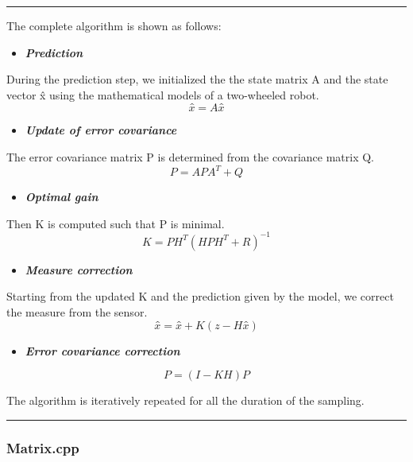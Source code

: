 \begin{center}\rule{0.5\linewidth}{0.5pt}\end{center}

The complete algorithm is shown as follows:

\begin{itemize}
\tightlist
\item
  \textbf{\emph{Prediction}}
\end{itemize}

During the prediction step, we initialized the the state matrix A and
the state vector x̂ using the mathematical models of a two-wheeled robot.
\[
x̂ = A x̂
\]

\begin{itemize}
\tightlist
\item
  \textbf{\emph{Update of error covariance}}
\end{itemize}

The error covariance matrix P is determined from the covariance matrix
Q. \[
P = A P A^T + Q
\]

\begin{itemize}
\tightlist
\item
  \textbf{\emph{Optimal gain}}
\end{itemize}

Then K is computed such that P is minimal. \[
K = P H^T (H P H^T + R)^{-1}
\]

\begin{itemize}
\tightlist
\item
  \textbf{\emph{Measure correction}}
\end{itemize}

Starting from the updated K and the prediction given by the model, we
correct the measure from the sensor. \[
x̂ = x̂ + K (z − H x̂)
\]

\begin{itemize}
\tightlist
\item
  \textbf{\emph{Error covariance correction}}
\end{itemize}

\[
P = (I − K H) P
\]

The algorithm is iteratively repeated for all the duration of the
sampling.

\begin{center}\rule{0.5\linewidth}{0.5pt}\end{center}

\hypertarget{matrix.cpp}{%
\subsubsection{Matrix.cpp}\label{matrix.cpp}}


